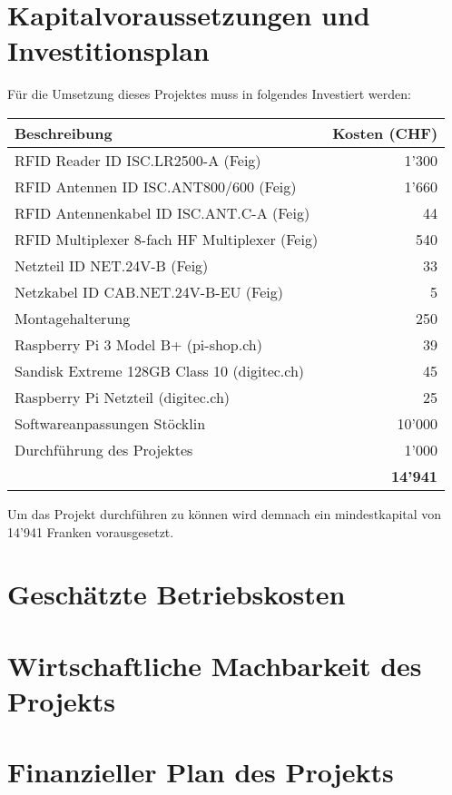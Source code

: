 \chapter{Kapitalvoraussetzungen und Investitionsplan}
Für die Umsetzung dieses Projektes muss in folgendes Investiert werden:

\vspace{1em}

\begin{tabularx}{\textwidth}{|X|r|}
	\hline
	\textbf{Beschreibung} & \textbf{Kosten (CHF)} \\
	\hline
	RFID Reader ID ISC.LR2500-A (Feig) & 1'300 \\
	\hline
	RFID Antennen ID ISC.ANT800/600 (Feig)& 1'660 \\
	\hline
	RFID Antennenkabel ID ISC.ANT.C-A (Feig) & 44 \\
	\hline
	RFID Multiplexer 8-fach HF Multiplexer (Feig) & 540 \\
	\hline
	Netzteil ID NET.24V-B (Feig) & 33 \\
	\hline
	Netzkabel ID CAB.NET.24V-B-EU (Feig) & 5 \\
	\hline
	Montagehalterung & 250 \\
	\hline
	Raspberry Pi 3 Model B+ (pi-shop.ch) & 39 \\
	\hline
	Sandisk Extreme 128GB Class 10 (digitec.ch) & 45 \\
	\hline
	Raspberry Pi Netzteil (digitec.ch) & 25 \\
	\hline
	Softwareanpassungen Stöcklin & 10'000 \\
	\hline
	Durchführung des Projektes & 1'000 \\
	\hline
	\hline
	 & \textbf{14'941} \\
	 \hline
\end{tabularx}

\vspace{1em}

Um das Projekt durchführen zu können wird demnach ein mindestkapital von 14'941 Franken vorausgesetzt.

\chapter{Geschätzte Betriebskosten}

\chapter{Wirtschaftliche Machbarkeit des Projekts}

\chapter{Finanzieller Plan des Projekts}
